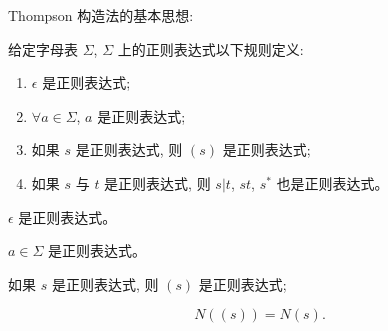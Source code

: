 \begin{frame}{}
  \begin{center}
    Thompson 构造法的基本思想: 
  \end{center}

  \begin{definition}[正则表达式]
    给定字母表 $\Sigma$, $\Sigma$ 上的正则表达式以下规则定义:
    \begin{enumerate}[(1)]
      \item $\epsilon$ 是正则表达式;
      \item $\forall a \in \Sigma$, $a$ 是正则表达式;
      \item 如果 $s$ 是正则表达式, 则 $(s)$ 是正则表达式;
      \item 如果 $s$ 与 $t$ 是正则表达式, 则 $s|t$, $st$, $s^{\ast}$ 也是正则表达式。
    \end{enumerate}
  \end{definition}
\end{frame}

\begin{frame}{}
  \begin{center}
    $\epsilon$ 是正则表达式。

    \pause
    \vspace{0.80cm}
  \end{center}
\end{frame}

\begin{frame}{}
  \begin{center}
    $a \in \Sigma$ 是正则表达式。

    \pause
    \vspace{0.80cm}
  \end{center}
\end{frame}

\begin{frame}{}
  \begin{center}
    如果 $s$ 是正则表达式, 则 $(s)$ 是正则表达式;

    \pause
    \vspace{0.60cm}
    \[
      N((s)) = N(s).
    \]
  \end{center}
\end{frame}

